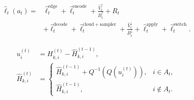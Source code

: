 \begin{align}
\widehat{\ell}_t(a_t) ={}&
\widehat{\ell}^{\mathrm{edge}}_t +
\widehat{\ell}^{\mathrm{encode}}_t +
\frac{\widehat{V}^{\uparrow}_t}{B^{\uparrow}_t} + R_t \\
&+ \widehat{\ell}^{\mathrm{decode}}_t +
\widehat{\ell}^{\mathrm{cloud+sampler}}_t +
\frac{\widehat{V}^{\downarrow}_t}{B^{\downarrow}_t} +
\widehat{\ell}^{\mathrm{apply}}_t +
\widehat{\ell}^{\mathrm{switch}}_t .
\end{align}

\begin{align}
u_i^{(t)} &= H_{k,i}^{(t)} - \widehat{H}_{k,i}^{(t-1)}, \\
\widehat{H}_{k,i}^{(t)} &=
\begin{cases}
\widehat{H}_{k,i}^{(t-1)} + Q^{-1}(Q(u_i^{(t)})), & i\in A_t,\\
\widehat{H}_{k,i}^{(t-1)}, & i\notin A_t .
\end{cases}
\end{align}


